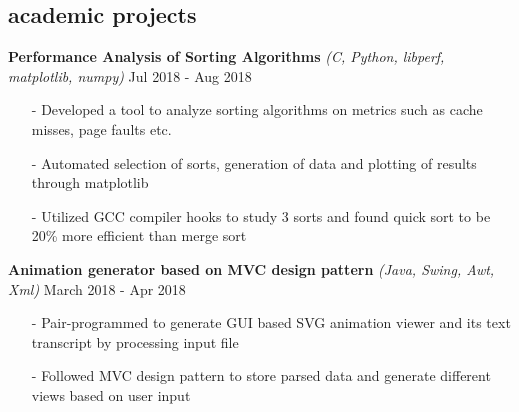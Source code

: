 \documentclass[a4paper, 10pt, oneside]{article}
\newcommand{\bulltetspace}{\vspace{-0.2em}}
\begin{document}
\begin{center}
\vspace{-0.3em}

\section{\color{headings}academic projects}
\vspace{-0.5em}


 \color{headings}\textbf{Performance Analysis of Sorting Algorithms} \textit{(C, Python, libperf, matplotlib, numpy)}  \hfill Jul 2018 - Aug 2018
\color{text1}
\vspace{-0.3em}
\begin{itemize}
\bulltetspace
\item[-] Developed a tool to analyze sorting algorithms on metrics such as cache misses, page faults etc.\\
\bulltetspace
\item[-] Automated selection of sorts, generation of data and plotting of results through matplotlib\\
\bulltetspace
\item[-] Utilized GCC compiler hooks to study 3 sorts and found quick sort to be 20\% more efficient than merge sort
\vspace{0.0em}
\end{itemize}

\color{headings}\textbf{Animation generator based on MVC design pattern} \textit{(Java, Swing, Awt, Xml)} \hfill March 2018 - Apr 2018
\color{text1}
\vspace{-0.3em}
\begin{itemize}
\bulltetspace
\item[-] Pair-programmed to generate GUI based SVG animation viewer and its text transcript by processing input file\\
\bulltetspace
\item[-] Followed MVC design pattern to store parsed data and generate different views based on user input
\vspace{0.0em}
\end{itemize}


\end{center}
\end{document}
